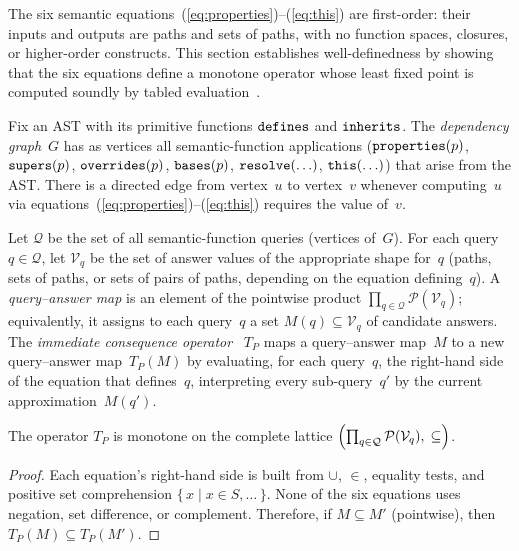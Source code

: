 The six semantic
equations~(\ref{eq:properties})--(\ref{eq:this}) are
first-order: their inputs and outputs are paths and sets of
paths, with no function spaces, closures, or higher-order
constructs.
This section establishes well-definedness by showing that
the six equations define a monotone operator whose least
fixed point is computed soundly by tabled
evaluation~\cite{tamaki1986-tabled-resolution}.

\begin{definition}\label{def:dependency-graph}
  Fix an AST with its primitive functions $\mathtt{defines}$ and
  $\mathtt{inherits}$.
  The \emph{dependency graph}~$G$ has as vertices all
  semantic-function applications
  ($\mathtt{properties}(p)$, $\mathtt{supers}(p)$, $\mathtt{overrides}(p)$,
    $\mathtt{bases}(p)$, $\mathtt{resolve}(\ldots)$,
  $\mathtt{this}(\ldots)$) that arise from the AST\@.
  There is a directed edge from vertex~$u$ to vertex~$v$
  whenever computing~$u$ via
  equations~(\ref{eq:properties})--(\ref{eq:this})
  requires the value of~$v$.
\end{definition}

\begin{definition}%
  \label{def:tp-operator}
  Let $\mathcal{Q}$ be the set of all
  semantic-function queries
  (vertices of~$G$).
  For each query $q \in \mathcal{Q}$, let
  $\mathcal{V}_q$ be the set of answer values of the
  appropriate shape for~$q$
  (paths, sets of paths, or sets of pairs of paths,
  depending on the equation defining~$q$).
  A \emph{query--answer map} is an element of the
  pointwise product
  $\prod_{q \in \mathcal{Q}} \mathcal{P}(\mathcal{V}_q)$;
  equivalently, it assigns to each query~$q$ a set
  $M(q) \subseteq \mathcal{V}_q$ of candidate answers.
  The \emph{immediate consequence
  operator}~\cite{vanemden1976-predicate-logic-semantics}
  $T_P$ maps a query--answer map~$M$ to a new
  query--answer map~$T_P(M)$ by evaluating, for each
  query~$q$, the right-hand side of the equation that
  defines~$q$, interpreting every sub-query~$q'$ by
  the current approximation~$M(q')$.
\end{definition}

\begin{lemma}[Monotonicity]\label{lem:monotonicity}
  The operator $T_P$ is monotone on the complete lattice
  $\Bigl(\prod_{q \in \mathcal{Q}} \mathcal{P}(\mathcal{V}_q),\; \subseteq\Bigr)$.
\end{lemma}

\begin{proof}
  Each equation's right-hand side is built from
  $\cup$, $\in$, equality tests, and positive set
  comprehension $\{\, x \mid x \in S, \ldots \,\}$.
  None of the six equations uses negation, set
  difference, or complement.
  Therefore, if $M \subseteq M'$ (pointwise), then
  $T_P(M) \subseteq T_P(M')$.
\end{proof}

